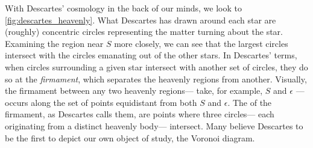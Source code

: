 \documentclass[12pt,twoside]{reedthesis}
\begin{document}
   With Descartes' cosmology in the back of our minds, we look to \cref{fig:descartes_heavenly}. What Descartes has drawn around each star are (roughly) concentric circles representing the matter turning about the star. Examining the region near $S$ more closely, we can see that the largest circles intersect with the circles emanating out of the other stars. In Descartes' terms, when circles surrounding a given star intersect with another set of circles, they do so at the \emph{firmament}, which separates the heavenly regions from another. Visually, the firmament between any two heavenly regions--- take, for example, $S$ and $\epsilon$ --- occurs along the set of points equidistant from both $S$ and $\epsilon$. The  of the firmament, as Descartes calls them, are points where three circles--- each originating from a distinct heavenly body--- intersect. Many believe Descartes to be the first to depict our own object of study, the Voronoi diagram.\par

\end{document}
